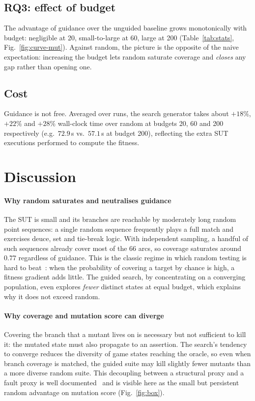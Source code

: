 \documentclass[conference]{IEEEtran}
\begin{document}
\subsection{RQ3: effect of budget}
The advantage of guidance over the unguided baseline grows monotonically with
budget: negligible at 20, small-to-large at 60, large at 200
(Table~\ref{tab:stats}, Fig.~\ref{fig:curve-mut}). Against random, the picture is
the opposite of the naive expectation: increasing the budget lets random
saturate coverage and \emph{closes} any gap rather than opening one.

\subsection{Cost}
Guidance is not free. Averaged over runs, the search generator takes about
$+18\%$, $+22\%$ and $+28\%$ wall-clock time over random at budgets 20, 60 and
200 respectively (e.g.\ $72.9$\,s vs.\ $57.1$\,s at budget 200), reflecting the
extra SUT executions performed to compute the fitness.

\section{Discussion}
\paragraph{Why random saturates and neutralises guidance}
The SUT is small and its branches are reachable by moderately long random point
sequences: a single random sequence frequently plays a full match and exercises
deuce, set and tie-break logic. With independent sampling, a handful of such
sequences already cover most of the 66 arcs, so coverage saturates around $0.77$
regardless of guidance. This is the classic regime in which random testing is
hard to beat~\cite{arcuri2012random}: when the probability of covering a target
by chance is high, a fitness gradient adds little. The guided search, by
concentrating on a converging population, even explores \emph{fewer} distinct
states at equal budget, which explains why it does not exceed random.

\paragraph{Why coverage and mutation score can diverge}
Covering the branch that a mutant lives on is necessary but not sufficient to
kill it: the mutated state must also propagate to an assertion. The search's
tendency to converge reduces the diversity of game states reaching the oracle,
so even when branch coverage is matched, the guided suite may kill slightly fewer
mutants than a more diverse random suite. This decoupling between a structural
proxy and a fault proxy is well documented~\cite{just2014mutants} and is visible
here as the small but persistent random advantage on mutation score
(Fig.~\ref{fig:box}).
\end{document}
